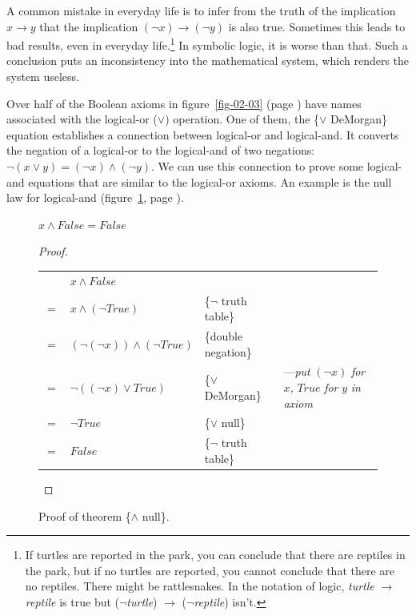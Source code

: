 A common mistake in everyday life is to infer from the truth of the
implication $x \rightarrow y$ that the implication
$(\neg x) \rightarrow (\neg y)$
is also true. Sometimes this leads to bad
results, even in everyday life.\footnote{If turtles
are reported in the park,
you can conclude that there are reptiles in the park,
but if no turtles are reported, you cannot conclude
that there are no reptiles.
There might be rattlesnakes.
In the notation of logic,
\emph{turtle} $\rightarrow$ \emph{reptile} is true
but ($\neg$\emph{turtle}) $\rightarrow$ ($\neg$\emph{reptile}) isn't.}
In symbolic logic,
it is worse than that. Such a conclusion puts an
inconsistency into the mathematical system, which renders the system useless.

Over half of the Boolean axioms in figure~\ref{fig-02-03} (page \pageref{fig-02-03})
have names associated with the logical-or ($\vee$) operation.
One of them, the
\{$\vee$ DeMorgan\} equation
establishes a connection between logical-or and logical-and.
It converts the negation of a logical-or to the logical-and of two negations:
$\neg(x \vee y) = (\neg x) \wedge (\neg y)$.
We can use this connection to prove some logical-and equations
that are similar to the logical-or axioms.
An example is the null law for logical-and
(figure~\ref{fig:and-null-thm}, page \pageref{fig:and-null-thm}).

\begin{figure}
\begin{theorem}
$x \wedge False = False$
\end{theorem}

\begin{proof}
\mbox{} \\
\begin{tabular}{llll}
    & $x \wedge False$                       & \\
$=$ & $x \wedge (\neg True)$                 & \{$\neg$ truth table\} \\
$=$ & $(\neg (\neg x)) \wedge (\neg True)$   & \{double negation\} \\
$=$ & $\neg ((\neg x) \vee True)$            & \{$\vee$ DeMorgan\} &---\emph{put} $(\neg x)$ \emph{for} $x$\emph{,} $True$ \emph{for} $y$ \emph{in axiom}\\
$=$ & $\neg True$                            & \{$\vee$ null\} \\
$=$ & $False$                                & \{$\neg$ truth table\} \\
\end{tabular}

\end{proof}
\caption{Proof of theorem \{$\wedge$ null\}.}
\label{fig:and-null-thm}
\end{figure}

